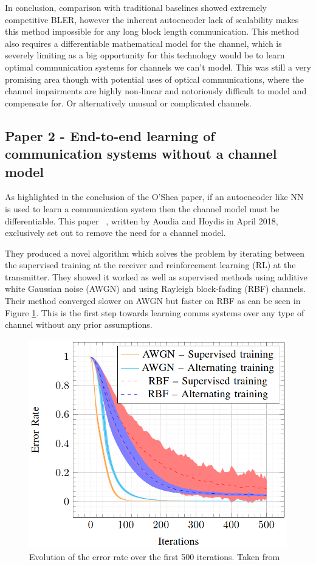 \documentclass[12pt,onecolumn,letterpaper]{article}
\begin{document}
In conclusion, comparison with traditional baselines showed extremely competitive BLER, however the inherent autoencoder lack of scalability makes this method impossible for any long block length communication. This method also requires a differentiable mathematical model for the channel, which is severely limiting as a big opportunity for this technology would be to learn optimal communication systems for channels we can't model. This was still a very promising area though with potential uses of optical communications, where the channel impairments are highly non-linear and notoriously difficult to model and compensate for. Or alternatively unusual or complicated channels.

\FloatBarrier
\subsection{Paper 2 - End-to-end learning of communication systems without a channel model}

As highlighted in the conclusion of the O'Shea paper, if an autoencoder like NN is used to learn a communication system then the channel model must be  differentiable. This paper ~\cite{Aoudia}, written by Aoudia and Hoydis in April 2018, exclusively set out to remove the need for a channel model. 

They produced a novel algorithm which solves the problem by iterating between the supervised training at the receiver and reinforcement learning (RL) at the transmitter. They showed it worked as well as supervised methods using additive white Gaussian noise (AWGN) and using Rayleigh block-fading (RBF) channels. Their method converged slower on AWGN but faster on RBF as can be seen in Figure \ref{fig:AoudiaTrainingSpeeds}. This is the first step towards learning comms systems over any type of channel without any prior assumptions. 

\begin{figure}[t]
\begin{center}
   \includegraphics[width=0.8\linewidth]{figures/Aoudia_relative_training_speeds.PNG}
\end{center}
   \caption{Evolution of the error rate over the first 500 iterations. Taken from~\cite{Aoudia}}
\label{fig:AoudiaTrainingSpeeds}
\end{figure}
\end{document}
